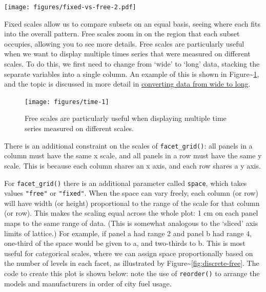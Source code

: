 \texttt{[image: figures/fixed-vs-free-2.pdf]}

Fixed scales allow us to compare subsets on an equal basis, seeing where
each fits into the overall pattern. Free scales zoom in on the region
that each subset occupies, allowing you to see more details. Free scales
are particularly useful when we want to display multiple times series
that were measured on different scales. To do this, we first need to
change from `wide' to `long' data, stacking the separate variables into
a single column. An example of this is shown in
Figure\textasciitilde{}\ref{fig:time}, and the topic is discussed in
more detail in \hyperref[sec:melting]{converting data from wide to
long}.

\begin{Shaded}
\begin{Highlighting}[]
\StringTok{  }
  \NormalTok{, } \StringTok{ }
\StringTok{  }\StringTok{ } \NormalTok{)}
\end{Highlighting}
\end{Shaded}

\begin{figure}
\texttt{[image: figures/time-1]} \caption{Free scales are particularly useful when displaying multiple time series measured on different scales.\label{fig:time}}
\end{figure}

There is an additional constraint on the scales of
\texttt{facet\_grid()}: all panels in a column must have the same x
scale, and all panels in a row must have the same y scale. This is
because each column shares an x axis, and each row shares a y axis.

For \texttt{facet\_grid()} there is an additional parameter called
\texttt{space}, which takes values \texttt{"free"} or \texttt{"fixed"}.
When the space can vary freely, each column (or row) will have width (or
height) proportional to the range of the scale for that column (or row).
This makes the scaling equal across the whole plot: 1 cm on each panel
maps to the same range of data. (This is somewhat analogous to the
`sliced' axis limits of lattice.) For example, if panel a had range 2
and panel b had range 4, one-third of the space would be given to a, and
two-thirds to b. This is most useful for categorical scales, where we
can assign space proportionally based on the number of levels in each
facet, as illustrated by Figure\textasciitilde{}\ref{fig:discrete-free}.
The code to create this plot is shown below: note the use of
\texttt{reorder()} to arrange the models and manufacturers in order of
city fuel usage. 


